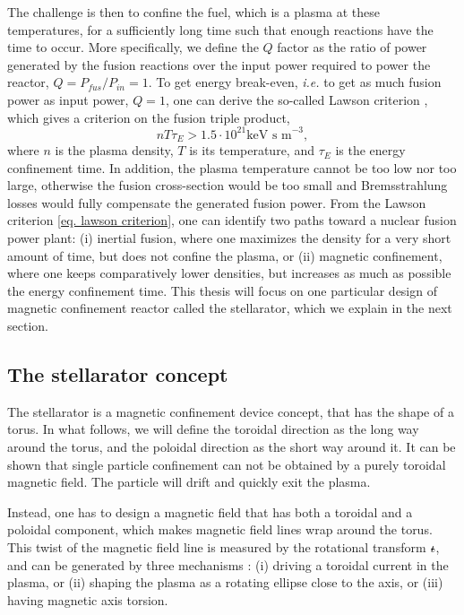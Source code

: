\documentclass[my_thesis.tex]{subfiles}
\begin{document}
The challenge is then to confine the fuel, which is a plasma at these temperatures, for a sufficiently long time such that enough reactions have the time to occur. More specifically, we define the $Q$ factor as the ratio of power generated by the fusion reactions over the input power required to power the reactor, $Q=P_{fus}/P_{in}=1$. To get energy break-even, \textit{i.e.} to get as much fusion power as input power, $Q=1$, one can derive the so-called Lawson criterion \citep{lawsonCriteriaPowerProducing1957}, which gives a criterion on the fusion triple product,
\begin{equation}
    nT\tau_E > 1.5\cdot 10^{21}\text{keV s m}^{-3}, \label{eq. lawson criterion}
\end{equation} 
where $n$ is the plasma density, $T$ is its temperature, and $\tau_E$ is the energy confinement time. In addition, the plasma temperature cannot be too low nor too large, otherwise the fusion cross-section would be too small and Bremsstrahlung losses would fully compensate the generated fusion power. From the Lawson criterion \ref{eq. lawson criterion}, one can identify two paths toward a nuclear fusion power plant: (i) inertial fusion, where one maximizes the density for a very short amount of time, but does not confine the plasma, or (ii) magnetic confinement, where one keeps comparatively lower densities, but increases as much as possible the energy confinement time. This thesis will focus on one particular design of magnetic confinement reactor called the stellarator, which we explain in the next section.




\subsection{The stellarator concept}
The stellarator is a magnetic confinement device concept, that has the shape of a torus. In what follows, we will define the toroidal direction as the long way around the torus, and the poloidal direction as the short way around it. It can be shown that single particle confinement can not be obtained by a purely toroidal magnetic field. The particle will drift and quickly exit the plasma. 

Instead, one has to design a magnetic field that has both a toroidal and a poloidal component, which makes magnetic field lines wrap around the torus. This twist of the magnetic field line is measured by the rotational transform $\text{$\iota\!\!$-}$, and can be generated by three mechanisms \citep{Helander2014}: (i) driving a toroidal current in the plasma, or (ii) shaping the plasma as a rotating ellipse close to the axis, or (iii) having magnetic axis torsion.
\end{document}
